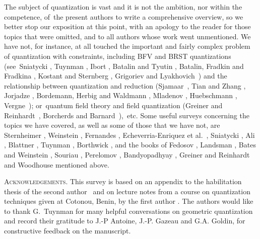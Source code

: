 \documentclass[12pt]{amsart}
\numberwithin{equation}{section}
\theoremstyle{remark}
\begin{document}
   The subject of quantization is vast and it is not the ambition,
nor within the competence, of~the present authors to write a
comprehensive overview, so we better stop our exposition at this
point, with an apology to the reader for those topics that were
omitted, and to all authors whose work went unmentioned. We have
not, for instance, at all touched the important and fairly complex
problem of quantization with constraints, including BFV and BRST
quantizations (see~Sniatycki \cite{bib:SniaCo}, Tuynman
\cite{bib:TuyBRST}, Ibort \cite{bib:Ibort}, Batalin and Tyutin
\cite{bib:BataTyu}, Batalin, Fradkin and Fradkina \cite{bib:BFF},
Kostant and Sternberg \cite{bib:+KoStern}, Grigoriev and
Lyakhovich~\cite{bib:GriLya}) and the relationship between quantization and
reduction (Sjamaar~\cite{bib:+Sjam}, Tian and Zhang \cite{bib:+TiZha}, Jorjadze
\cite{bib:+Jorj}, Bordemann, Herbig and Waldmann \cite{bib:+BoHeWa}, Mladenov
\cite{bib:+Mlad}, Huebschmann \cite{bib:+Hueb}, Vergne~\cite{bib:+Verg});
or~quantum field theory and field quantization (Greiner and
Reinhardt~\cite{bib:GreiRei}, Borcherds and Barnard~\cite{bib:BaBo}),~etc. Some
useful surveys concerning the topics we have  covered, as well as some of those
that we have not, are Sternheimer \cite{bib:Stw}, Weinstein \cite{bib:WeinAst},
Fernandes \cite{bib:Fern}, Echeverria-Enriquez et
al.~\cite{bib:EEMLRRVM}, Sniatycki \cite{bib:SniaA}, Ali
\cite{bib:AliSurv}, Blattner \cite{bib:Blatt}, Tuynman \cite{bib:TuyWis},
Borthwick \cite{bib:+Bwsrv}, and the books of Fedosov \cite{bib:FedosBk},
Landsman \cite{bib:LandsBk}, Bates and Weinstein \cite{bib:BaWei}, Souriau
\cite{bib:SouSD}, Perelomov \cite{bib:Perel}, Bandyopadhyay \cite{bib:+Bandy},
Greiner and Reinhardt \cite{bib:GreiRei} and Woodhouse \cite{bib:Woodh}
mentioned above.

\bigskip

\noindent\textsc{Acknowledgements.} This survey is based on an appendix to the
habilitation thesis of the second author~\cite{bib:EDrSc} and on lecture notes
from a course on quantization techniques given at Cotonou, Benin, by the first
author \cite{bib:AliBen}.
The authors would like to thank G.~Tuynman for many helpful conversations
on geometric quantization and record their gratitude to J.-P Antoine,
J.-P. Gazeau and G.A. Goldin, for constructive feedback on the manuscript.
\end{document}
